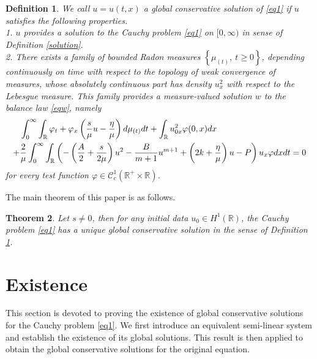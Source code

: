 \documentclass[10pt]{article}
\newtheorem{theo}{Theorem}[section]
\newtheorem{defi}[theo]{Definition}
\numberwithin{equation}{section}
\begin{document}
	\begin{defi}\label{conservative}
		We call $u=u(t,x)$ a global conservative solution of \eqref{eq1} if $u$ satisfies the following properties. \\
		1. $u$ provides a solution to the Cauchy problem \eqref{eq1} on $[0,\infty)$ in sense of Definition \ref{solution}.\\
		2. There exists a family of bounded Radon measures $\left\{\mu_{(t)},\ t\geq0\right\}$, depending continuously on time with respect to the topology of weak convergence of measures, whose absolutely continuous part has density $u_x^2$ with respect to the Lebesgue measure. This family provides a measure-valued solution $w$ to the balance law \eqref{eqw}, namely
		\begin{align}
			&\int_{0}^{\infty}\int_\mathbb{R}\varphi_t+\varphi_x\left(\frac{s}{\mu}u-\frac{\eta}{\mu}\right)d\mu_{(t)}dt+\int_{\mathbb{R}}u_{0x}^{2}\varphi(0,x)dx\notag\\
			+&\frac{2}{\mu}\int_{0}^{\infty}\int_\mathbb{R}\left(-\left(\frac{A}{2}+\frac{s}{2\mu}\right)u^2-\frac{B}{m+1}u^{m+1}+\left(2k+\frac{\eta}{\mu}\right)u-P\right)u_x\varphi dxdt=0\label{w}
		\end{align}
		for every test function $\varphi\in\mathcal{C}_c^1(\mathbb{R}^+\times\mathbb{R})$.
	\end{defi}
	
	The main theorem of this paper is as follows.
	\begin{theo}
		Let $s\neq0$, then for any initial data $u_0\in H^1(\mathbb{R})$, the Cauchy problem \eqref{eq1} has a unique global conservative solution in the sense of
		Definition \ref{conservative}.
	\end{theo}
	
	\section{Existence}\label{Existence}
	This section is devoted to proving the existence of global conservative solutions for the Cauchy problem \eqref{eq1}. We first introduce an equivalent semi-linear system and establish the existence of its global solutions. This result is then applied to obtain the global conservative solutions for the original equation.
\end{document}
